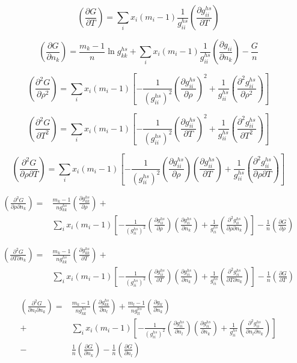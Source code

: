 \documentclass[english]{../thermomemo/thermomemo}
\newcommand*{\pder}[2]{\left(\frac{\partial #1}{\partial #2}\right)}
\newcommand*{\pdder}[2]{\left(\frac{\partial^2 #1}{\partial #2^2}\right)}
\newcommand*{\pdcross}[3]{\left(\frac{\partial^2 #1}{\partial #2 \partial #3}\right)}
\newcommand{\lp}{\left(}
\newcommand{\rp}{\right)}
\begin{document}
\begin{equation}
  \pder{G}{T} = \sum_i x_i(m_i-1) \frac{1}{g_{ii}^{hs}} \pder{g_{ii}^{hs}}{T}
\end{equation}

\begin{equation}
  \pder{G}{n_k} = \frac{m_k-1}{n}\ln g_{kk}^{hs} + \sum_i x_i (m_i-1) \frac{1}{g_{ii}^{hs}} \pder{g_{ii}}{n_k} -\frac{G}{n}
\end{equation}

\begin{equation}
  \pdder{G}{\rho} = \sum_i x_i(m_i-1) \left[ -\frac{1}{\lp g_{ii}^{hs} \rp^2} \pder{g_{ii}^{hs}}{\rho}^2 + \frac{1}{g_{ii}^{hs}} \pdder{g_{ii}^{hs}}{\rho} \right]
\end{equation}

\begin{equation}
  \pdder{G}{T} = \sum_i x_i(m_i-1) \left[ -\frac{1}{\lp g_{ii}^{hs} \rp^2} \pder{g_{ii}^{hs}}{T}^2 + \frac{1}{g_{ii}^{hs}} \pdder{g_{ii}^{hs}}{T} \right]
\end{equation}

\begin{equation}
  \pdcross{G}{\rho}{T} = \sum_i x_i(m_i-1) \left[ -\frac{1}{\lp g_{ii}^{hs} \rp^2} \pder{g_{ii}^{hs}}{\rho} \pder{g_{ii}^{hs}}{T} + \frac{1}{g_{ii}^{hs}} \pdcross{g_{ii}^{hs}}{\rho}{T} \right]
\end{equation}

\begin{align}
      \pdcross{G}{\rho}{n_k} =&  \frac{m_k-1}{n g_{kk}^{hs}} \pder{g_{kk}^{hs}}{\rho} + \\
    & \sum_i x_i(m_i-1) \left[ -\frac{1}{\lp g_{ii}^{hs} \rp^2} \pder{g_{ii}^{hs}}{\rho} \pder{g_{ii}^{hs}}{n_k} + \frac{1}{g_{ii}^{hs}} \pdcross{g_{ii}^{hs}}{\rho}{n_k} \right] -\frac{1}{n} \pder{G}{\rho}
\end{align}

\begin{equation}
  \begin{aligned}
    \pdcross{G}{T}{n_k} =& \frac{m_k-1}{n g_{kk}^{hs}} \pder{g_{kk}^{hs}}{T} + \\
    & \sum_i x_i(m_i-1) \left[ -\frac{1}{\lp g_{ii}^{hs} \rp^2} \pder{g_{ii}^{hs}}{T} \pder{g_{ii}^{hs}}{n_k} + \frac{1}{g_{ii}^{hs}} \pdcross{g_{ii}^{hs}}{T}{n_k} \right] -\frac{1}{n} \pder{G}{T}
  \end{aligned}
\end{equation}

\begin{equation}
  \begin{aligned}
    \pdcross{G}{n_l}{n_k} =& \frac{m_k-1}{n g_{kk}^{hs}} \pder{g_{kk}^{hs}}{n_l} + \frac{m_l-1}{n g_{ll}^{hs}} \pder{g_{ll}}{n_k} \\
    +& \sum_i x_i(m_i-1) \left[ -\frac{1}{\lp g_{ii}^{hs} \rp^2} \pder{g_{ii}^{hs}}{n_l} \pder{g_{ii}^{hs}}{n_k} + \frac{1}{g_{ii}^{hs}} \pdcross{g_{ii}^{hs}}{n_l}{n_k} \right] \\
    -& \frac{1}{n} \pder{G}{n_k} - \frac{1}{n} \pder{G}{n_l}
  \end{aligned}
\end{equation}
\end{document}
